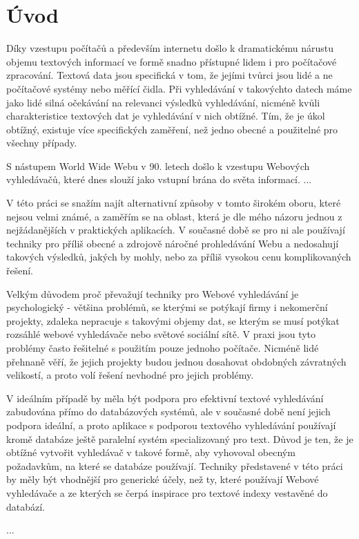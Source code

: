 \documentclass[11pt]{article}
\begin{document}
\section{Úvod}
Díky vzestupu počítačů a především internetu došlo k dramatickému nárustu
objemu textových informací ve formě snadno přístupné lidem i pro počítačové
zpracování. Textová data jsou specifická v tom, že jejími tvůrci jsou lidé a ne
počítačové systémy nebo měřící čidla. Při vyhledávání v takovýchto datech máme
jako lidé silná očekávání na relevanci výsledků vyhledávání, nicméně kvůli
charakteristice textových dat je vyhledávání v nich obtížné. Tím, že je úkol
obtížný, existuje více specifických zaměření, než jedno obecné a použitelné pro
všechny případy.

S nástupem World Wide Webu v 90. letech došlo k vzestupu Webových vyhledávačů,
které dnes slouží jako vstupní brána do světa informací.
...

V této práci se snažím najít alternativní způsoby v tomto širokém oboru, které
nejsou velmi známé, a zaměřím se na oblast, která je dle mého názoru jednou z
nejžádanějších v praktických aplikacích. V současné době se pro ni ale
používají techniky pro příliš obecné a zdrojově náročné prohledávání Webu a
nedosahují takových výsledků, jakých by mohly, nebo za příliš vysokou cenu
komplikovaných řešení. 

Velkým důvodem proč převažují techniky pro Webové vyhledávání je psychologický
- většina problémů, se kterými se potýkají firmy i nekomerční projekty, zdaleka
nepracuje s takovými objemy dat, se kterým se musí potýkat rozsáhlé webové
vyhledávače nebo světové sociální sítě. V praxi jsou tyto problémy často
řešitelné s použitím pouze jednoho počítače. Nicméně lidé přehnaně věří, že
jejich projekty budou jednou dosahovat obdobných závratných velikostí, a proto
volí řešení nevhodné pro jejich problémy.

V ideálním případě by měla být podpora pro efektivní textové vyhledávání
zabudována přímo do databázových systémů, ale v současné době není jejich
podpora ideální, a proto aplikace s podporou textového vyhledávání používají
kromě databáze ještě paralelní systém specializovaný pro text. Důvod je ten, že
je obtížné vytvořit vyhledávač v takové formě, aby vyhovoval obecným
požadavkům, na které se databáze používají. Techniky představené v této práci
by měly být vhodnější pro generické účely, než ty, které používají Webové
vyhledávače a ze kterých se čerpá inspirace pro textové indexy vestavěné do
databází.

...
\end{document}
